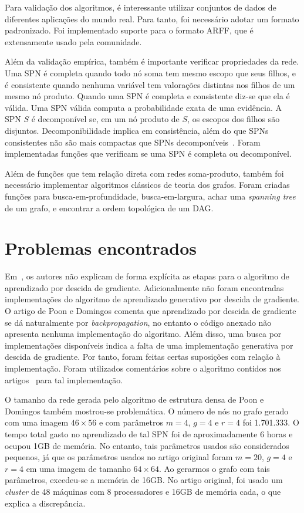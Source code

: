 \documentclass[12pt]{article}
\theoremstyle{plain}
\numberwithin{equation}{section}
\begin{document}
Para validação dos algoritmos, é interessante utilizar conjuntos de dados de diferentes aplicações
do mundo real. Para tanto, foi necessário adotar um formato padronizado. Foi implementado suporte
para o formato ARFF, que é extensamente usado pela comunidade.

Além da validação empírica, também é importante verificar propriedades da rede. Uma SPN é completa
quando todo nó soma tem mesmo escopo que seus filhos, e é consistente quando nenhuma variável tem
valorações distintas nos filhos de um mesmo nó produto. Quando uma SPN é completa e consistente
diz-se que ela é válida. Uma SPN válida computa a probabilidade exata de uma evidência. A SPN $S$ é
decomponível se, em um nó produto de $S$, os escopos dos filhos são disjuntos. Decomponibilidade
implica em consistência, além do que SPNs consistentes não são mais compactas que SPNs
decomponíveis~\cite{theoretical-spn}. Foram implementadas funções que verificam se uma SPN é
completa ou decomponível.

Além de funções que tem relação direta com redes soma-produto, também foi necessário implementar
algoritmos clássicos de teoria dos grafos. Foram criadas funções para busca-em-profundidade,
busca-em-largura, achar uma \textit{spanning tree} de um grafo, e encontrar a ordem topológica de
um DAG\@.

\section{Problemas encontrados}\label{sct-prob}

Em~\cite{poon-domingos}, os autores não explicam de forma explícita as etapas para o algoritmo de
aprendizado por descida de gradiente. Adicionalmente não foram encontradas implementações do
algoritmo de aprendizado generativo por descida de gradiente. O artigo de Poon e Domingos comenta
que aprendizado por descida de gradiente se dá naturalmente por
\textit{backpropagation}\cite{poon-domingos}, no entanto o código anexado não apresenta nenhuma
implementação do algoritmo. Além disso, uma busca por implementações disponíveis indica a falta
de uma implementação generativa por descida de gradiente. Por tanto, foram feitas certas suposições
com relação à implementação. Foram utilizados comentários sobre o algoritmo contidos nos
artigos~\cite{poon-domingos,discriminative} para tal implementação.

O tamanho da rede gerada pelo algoritmo de estrutura densa de Poon e Domingos também mostrou-se
problemática. O número de nós no grafo gerado com uma imagem $46\times 56$ e com parâmetros $m=4$,
$g=4$ e $r=4$ foi 1.701.333. O tempo total gasto no aprendizado de tal SPN foi de aproximadamente 6
horas e ocupou 1GB de memória. No entanto, tais parâmetros usados são considerados pequenos, já que
os parâmetros usados no artigo original foram $m=20$, $g=4$ e $r=4$ em uma imagem de tamanho
$64\times 64$. Ao gerarmos o grafo com tais parâmetros, excedeu-se a memória de 16GB\@. No artigo
original, foi usado um \textit{cluster} de 48 máquinas com 8 processadores e 16GB de memória cada,
o que explica a discrepância.
\end{document}
